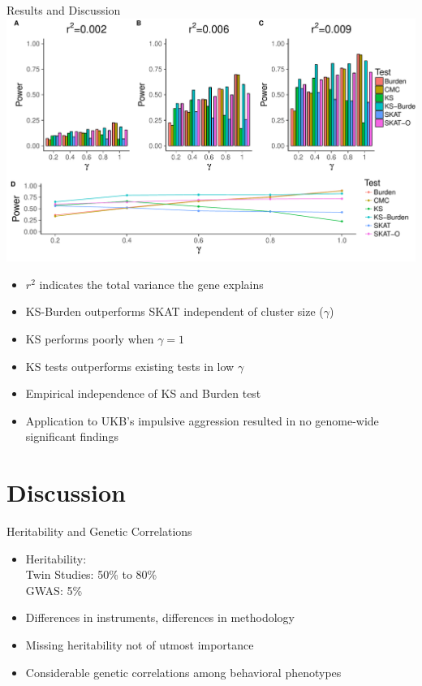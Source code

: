 \documentclass{beamer}
\begin{document}
\begin{frame}[t]{Results and Discussion}
  \tiny
  \includegraphics[width=0.8\linewidth]{../ksburden/figures/combined_power_analysis.pdf}
  \begin{itemize}
    \item $r^2$ indicates the total variance the gene explains
    \item KS-Burden outperforms SKAT independent of cluster size ($\gamma$)
    \item KS performs poorly when $\gamma=1$
    \item KS tests outperforms existing tests in low $\gamma$
    \item Empirical independence of KS and Burden test
    \item Application to UKB's impulsive aggression resulted in no genome-wide significant findings
  \end{itemize}
\end{frame}

\section{Discussion}

\begin{frame}[t]{Heritability and Genetic Correlations}
  \begin{itemize}
    \item Heritability:\\
      Twin Studies: 50\% to 80\% \\
      GWAS: 5\%
    \item Differences in instruments, differences in methodology
    \item Missing heritability not of utmost importance
    \item Considerable genetic correlations among behavioral phenotypes
  \end{itemize}
\end{frame}
\end{document}
